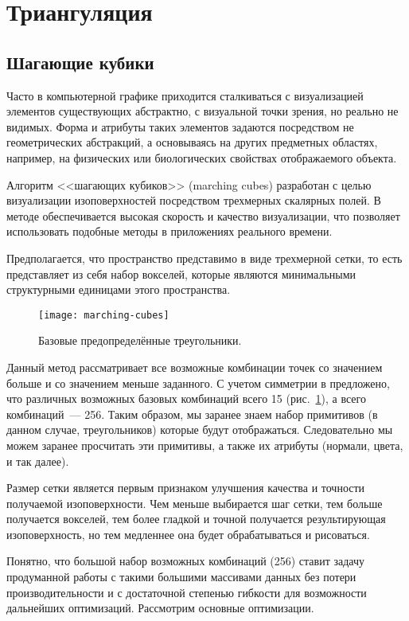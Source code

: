 \section{Триангуляция}
\subsection{Шагающие кубики}
Часто в компьютерной графике приходится сталкиваться с визуализацией элементов существующих абстрактно, с визуальной точки зрения, но реально не видимых. Форма и атрибуты таких элементов задаются посредством не геометрических абстракций, а основываясь на других предметных областях, например, на физических или биологических свойствах отображаемого объекта.

Алгоритм <<шагающих кубиков>> (marching cubes) разработан с целью визуализации изоповерхностей посредством трехмерных скалярных полей. В методе обеспечивается высокая скорость и качество визуализации, что позволяет использовать подобные методы в приложениях реального времени.

Предполагается, что пространство представимо в виде трехмерной сетки, то есть представляет из себя набор вокселей, которые являются минимальными структурными единицами этого пространства.

\begin{figure}[h]
  \centering
  \texttt{[image: marching-cubes]}
  \caption{Базовые предопределённые треугольники.}
  \label{fig:marching-cubes}
\end{figure}

Данный метод рассматривает все возможные комбинации точек со значением больше и со значением меньше заданного. С учетом симметрии в \cite{lorensen} предложено, что различных возможных базовых комбинаций всего 15 (рис.~\ref{fig:marching-cubes}), а всего комбинаций~--- 256. Таким образом, мы заранее знаем набор примитивов (в данном случае, треугольников) которые будут отображаться. Следовательно мы можем заранее просчитать эти примитивы, а также их атрибуты (нормали, цвета, и так далее).

Размер сетки является первым признаком улучшения качества и точности получаемой изоповерхности. Чем меньше выбирается шаг сетки, тем больше получается вокселей, тем более гладкой и точной получается результирующая изоповерхность, но тем медленнее она будет обрабатываться и рисоваться.

Понятно, что большой набор возможных комбинаций (256) ставит задачу продуманной работы с такими большими массивами данных без потери производительности и с достаточной степенью гибкости для возможности дальнейших оптимизаций. Рассмотрим основные оптимизации.

